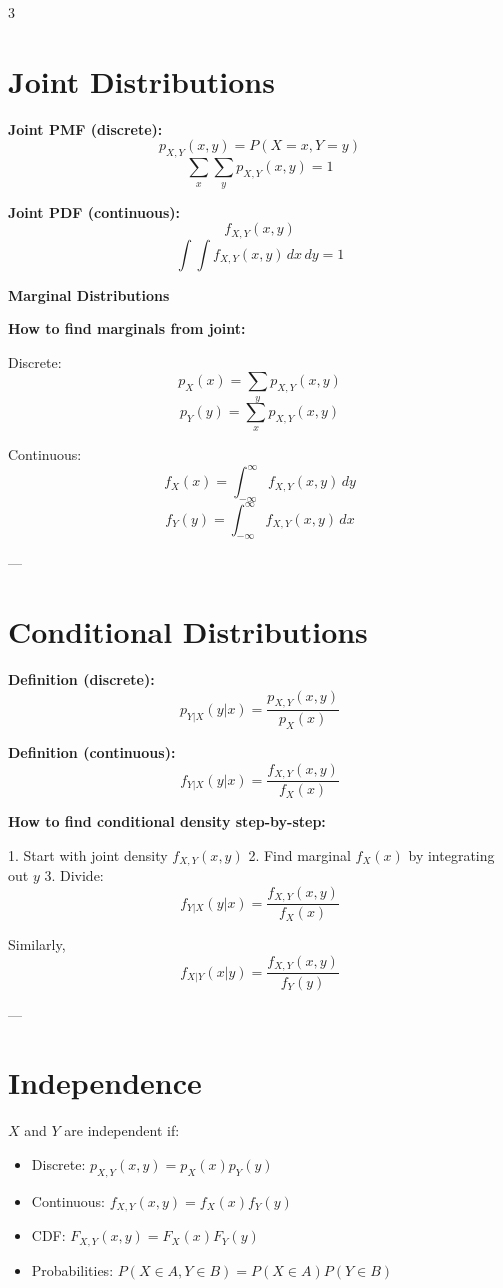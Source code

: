 \documentclass[10pt]{article}
\begin{document}
\begin{multicols}{3}

\section*{Joint Distributions}

\textbf{Joint PMF (discrete):}
\[
p_{X,Y}(x,y)=P(X=x,Y=y)
\]
\[
\sum_x \sum_y p_{X,Y}(x,y)=1
\]

\textbf{Joint PDF (continuous):}
\[
f_{X,Y}(x,y)
\]
\[
\int\int f_{X,Y}(x,y)\,dx\,dy=1
\]

\textbf{Marginal Distributions}

\textbf{How to find marginals from joint:}

Discrete:
\[
p_X(x)=\sum_y p_{X,Y}(x,y)
\]
\[
p_Y(y)=\sum_x p_{X,Y}(x,y)
\]

Continuous:
\[
f_X(x)=\int_{-\infty}^{\infty} f_{X,Y}(x,y)\,dy
\]
\[
f_Y(y)=\int_{-\infty}^{\infty} f_{X,Y}(x,y)\,dx
\]

---

\section*{Conditional Distributions}

\textbf{Definition (discrete):}
\[
p_{Y|X}(y|x)=\frac{p_{X,Y}(x,y)}{p_X(x)}
\]

\textbf{Definition (continuous):}
\[
f_{Y|X}(y|x)=\frac{f_{X,Y}(x,y)}{f_X(x)}
\]

\textbf{How to find conditional density step-by-step:}

1. Start with joint density $f_{X,Y}(x,y)$  
2. Find marginal $f_X(x)$ by integrating out $y$  
3. Divide:
\[
f_{Y|X}(y|x)=\frac{f_{X,Y}(x,y)}{f_X(x)}
\]

Similarly,
\[
f_{X|Y}(x|y)=\frac{f_{X,Y}(x,y)}{f_Y(y)}
\]

---

\section*{Independence}
$X$ and $Y$ are independent if:
\begin{itemize}
    \item Discrete: $p_{X,Y}(x,y)=p_X(x)p_Y(y)$
    \item Continuous: $f_{X,Y}(x,y)=f_X(x)f_Y(y)$
    \item CDF: $F_{X,Y}(x,y) = F_X(x)F_Y(y)$
    \item Probabilities: $P(X \in A, Y \in B) = P(X \in A)P(Y \in B)$
\end{itemize}


\end{multicols}
\end{document}
